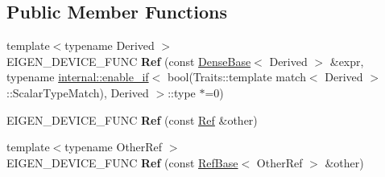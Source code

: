 \subsection*{Public Member Functions}
\begin{DoxyCompactItemize}
\item 
\mbox{\label{class_eigen_1_1_ref_3_01const_01_t_plain_object_type_00_01_options_00_01_stride_type_01_4_a6624f9a5339cb39c6e2d8caa04263eb8}} 
{\footnotesize template$<$typename Derived $>$ }\\E\+I\+G\+E\+N\+\_\+\+D\+E\+V\+I\+C\+E\+\_\+\+F\+U\+NC {\bfseries Ref} (const \mbox{\hyperlink{class_eigen_1_1_dense_base}{Dense\+Base}}$<$ Derived $>$ \&expr, typename \mbox{\hyperlink{struct_eigen_1_1internal_1_1enable__if}{internal\+::enable\+\_\+if}}$<$ bool(Traits\+::template match$<$ Derived $>$\+::Scalar\+Type\+Match), Derived $>$\+::type $\ast$=0)
\item 
\mbox{\label{class_eigen_1_1_ref_3_01const_01_t_plain_object_type_00_01_options_00_01_stride_type_01_4_af70bee1d7a4346cb69f2e3ff9f3bd6b2}} 
E\+I\+G\+E\+N\+\_\+\+D\+E\+V\+I\+C\+E\+\_\+\+F\+U\+NC {\bfseries Ref} (const \mbox{\hyperlink{class_eigen_1_1_ref}{Ref}} \&other)
\item 
\mbox{\label{class_eigen_1_1_ref_3_01const_01_t_plain_object_type_00_01_options_00_01_stride_type_01_4_a3fb134869debdf939a02490b549df2a7}} 
{\footnotesize template$<$typename Other\+Ref $>$ }\\E\+I\+G\+E\+N\+\_\+\+D\+E\+V\+I\+C\+E\+\_\+\+F\+U\+NC {\bfseries Ref} (const \mbox{\hyperlink{class_eigen_1_1_ref_base}{Ref\+Base}}$<$ Other\+Ref $>$ \&other)
\end{DoxyCompactItemize}

